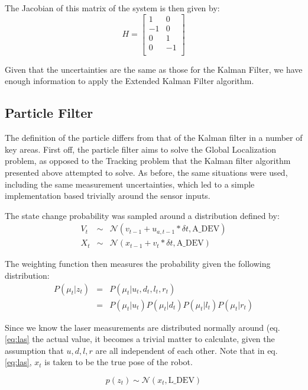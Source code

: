 \documentclass[english]{article}
\begin{document}
The Jacobian of this matrix of the system is then given by:
\begin{equation}
H = \left[ \begin{array}{cc}
1&0\\
-1&0\\
0&1\\
0&-1\\ \end{array} \right]
\end{equation}

Given that the uncertainties are the same as those for the Kalman Filter, we have enough information to apply the Extended Kalman Filter algorithm.

\subsection{Particle Filter}
The definition of the particle differs from that of the Kalman filter in a number of key areas. First off, the particle filter aims to solve the Global Localization problem, as opposed to the Tracking problem that the Kalman filter algorithm presented above attempted to solve. As before, the same situations were used, including the same measurement uncertainties, which led to a simple implementation based trivially around the sensor inputs.

The state change probability was sampled around a distribution defined by:
\begin{eqnarray}
V_t &\sim& \mathcal{N}(v_{t-1} + u_{a,t-1}*\delta t, \mathrm{A\_DEV}) \\
X_t &\sim& \mathcal{N}(x_{t-1} + v_t*\delta t, \mathrm{A\_DEV})
\end{eqnarray}

The weighting function then measures the probability given the following distribution:
\begin{eqnarray}
P(\mu_t | z_t) &=& P(\mu_t | u_t, d_t, l_t, r_t) \\
 &=& P(\mu_t | u_t) P(\mu_t | d_t) P(\mu_t | l_t) P(\mu_t | r_t)
\end{eqnarray}

Since we know the laser measurements are distributed normally around (eq. \ref{eq:las} the actual value, it becomes a trivial matter to calculate, given the assumption that $u, d, l, r$ are all independent of each other. Note that in eq. \ref{eq:las}, $x_{t}$ is taken to be the true pose of the robot.

\begin{equation}
\label{eq:las}
p(z_t) \sim \mathcal{N}(x_t, \mathrm{L\_DEV})
\end{equation}
\end{document}
